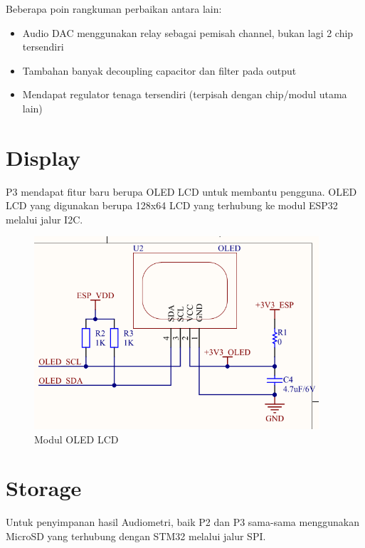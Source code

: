 \documentclass{book} %
\begin{document}
	Beberapa poin rangkuman perbaikan antara lain:
	\begin{itemize}
		\item Audio DAC menggunakan relay sebagai pemisah channel, bukan lagi 2 chip tersendiri
		\item Tambahan banyak decoupling capacitor dan filter pada output
		\item Mendapat regulator tenaga tersendiri (terpisah dengan chip/modul utama lain)
	\end{itemize}
    
    \section{Display}
    
    P3 mendapat fitur baru berupa OLED LCD untuk membantu pengguna.
    OLED LCD yang digunakan berupa 128x64 LCD yang terhubung ke modul ESP32 melalui jalur I2C.
    
    \begin{figure}[!ht]
    	\centering
    	\includegraphics[width=300pt]{images/p3_oled}
    	\caption{Modul OLED LCD}
    \end{figure}
    
    \newpage
    \section{Storage}
    
    Untuk penyimpanan hasil Audiometri, baik P2 dan P3 sama-sama menggunakan MicroSD yang
    terhubung dengan STM32 melalui jalur SPI.
    
\end{document}
